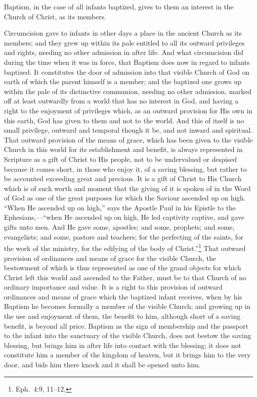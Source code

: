 \documentclass[
]{book}
\begin{document}
Baptism, in the case of all infants baptized, gives to them an interest in the Church of Christ, as its members.

Circumcision gave to infants in other days a place in the ancient Church as its members; and they grew up within its pale entitled to all its outward privileges and rights, needing no other admission in after life. And what circumcision did during the time when it was in force, that Baptism does now in regard to infants baptized. It constitutes the door of admission into that visible Church of God on earth of which the parent himself is a member; and the baptized one grows up within the pale of its distinctive communion, needing no other admission, marked off at least outwardly from a world that has no interest in God, and having a right to the enjoyment of privileges which, as an outward provision for His own in this earth, God has given to them and not to the world. And this of itself is no small privilege, outward and temporal though it be, and not inward and spiritual. That outward provision of the means of grace, which has been given to the visible Church in this world for its establishment and benefit, is always represented in Scripture as a gift of Christ to His people, not to be undervalued or despised because it comes short, in those who enjoy it, of a saving blessing, but rather to be accounted exceeding great and precious. It is a gift of Christ to His Church which is of such worth and moment that the giving of it is spoken of in the Word of God as one of the great purposes for which the Saviour ascended up on high. ``When He ascended up on high,'' says the Apostle Paul in his Epistle to the Ephesians,---``when He ascended up on high, He led captivity captive, and gave gifts unto men. And He gave some, apostles; and some, prophets; and some, evangelists; and some, pastors and teachers; for the perfecting of the saints, for the work of the ministry, for the edifying of the body of Christ.''\footnote{Eph.~4:9, 11--12.} That outward provision of ordinances and means of grace for the visible Church, the bestowment of which is thus represented as one of the grand objects for which Christ left this world and ascended to the Father, must be to that Church of no ordinary importance and value. It is a right to this provision of outward ordinances and means of grace which the baptized infant receives, when by his Baptism he becomes formally a member of the visible Church; and growing up in the use and enjoyment of them, the benefit to him, although short of a saving benefit, is beyond all price. Baptism as the sign of membership and the passport to the infant into the sanctuary of the visible Church, does not bestow the saving blessing, but brings him in after life into contact with the blessing; it does not constitute him a member of the kingdom of heaven, but it brings him to the very door, and bids him there knock and it shall be opened unto him.
\end{document}
